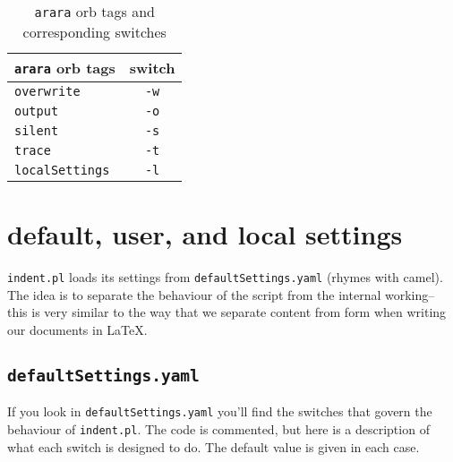 \begin{table}[!ht]
	\centering
	\caption{\lstinline!arara! orb tags and corresponding switches}
	\label{tab:orbsandswitches}
	\begin{tabular}{lc}
		\toprule
		\lstinline!arara! orb tags & switch         \\
		\midrule
		\lstinline!overwrite!      & \lstinline!-w! \\
		\lstinline!output!         & \lstinline!-o! \\
		\lstinline!silent!         & \lstinline!-s! \\
		\lstinline!trace!          & \lstinline!-t! \\
		\lstinline!localSettings!  & \lstinline!-l! \\
		\bottomrule
	\end{tabular}
\end{table}
\section{default, user, and local settings}\label{sec:defuseloc}
\lstinline!indent.pl! loads its settings from \lstinline!defaultSettings.yaml! 
(rhymes with camel). The idea is to separate the behaviour of the script 
from the internal working-- this is very similar to the way that we separate content
from form when writing our documents in \LaTeX.
     
     
\subsection{\lstinline!defaultSettings.yaml!}
If you look in \lstinline!defaultSettings.yaml! you'll find the switches 
that govern the behaviour of \lstinline!indent.pl!. The code is commented, 
but here is a description of what each switch is designed to do. The default 
value is given in each case.
 	 	 	 	 	
